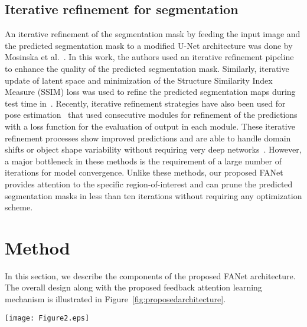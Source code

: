 \documentclass[journal]{IEEEtran}
\begin{document}
\subsection{Iterative refinement for segmentation}
An iterative refinement of the segmentation mask by feeding the input image and the predicted segmentation mask to a modified U-Net architecture was done by Mosinska et al.~\cite{mosinska2018beyond}. {In this work, the authors used an iterative refinement pipeline to enhance the quality of the predicted segmentation mask}. Similarly, iterative update of latent space and minimization of the Structure Similarity Index Measure (SSIM) loss was used to refine the predicted segmentation maps during test time in~\cite{Prashant:ECCV20}. Recently, iterative refinement strategies have also been used for pose estimation~\cite{newell2016stacked,wei2016convolutional} that used consecutive modules for refinement of the predictions with a loss function for the evaluation of output in each module. These iterative refinement processes show improved predictions and are able to handle domain shifts or object shape variability without requiring very deep networks~\cite{Prashant:ECCV20}. However, a major bottleneck in these methods is the requirement of a large number of iterations for model convergence. Unlike these methods, our proposed \ac{FANet} provides attention to the specific region-of-interest and can prune the {predicted segmentation masks} in less than ten iterations without requiring any optimization scheme. 

\section{Method}
\label{methodology}
{In this section, we describe the components of the proposed \ac{FANet} architecture.} The overall design along with the proposed feedback attention learning mechanism is illustrated in  Figure~\ref{fig:proposedarchitecture}. 

\begin{figure*}[t!]
    \centering
    \texttt{[image: Figure2.eps]}
    \caption{FANet with squeeze and excite residual (SE-Residual) block and MixPool block. (a) SE-Residual block integrated with squeeze and excite layer uses  convolution to concatenate the high-resolution feature representation with the the encoded feature vector. (b) MixPool block represents attention mechanism in our network. The input mask is downscaled to the corresponding layer feature map size  which is fused with the masked feature map representation  for hard attention of input feature in that layer . Finally, the attenuated feature map  and the feature maps  are both concatenated. c) Proposed FANet showing the complete network architecture. Encoder-decoder architecture with skip-connections (in dotted arrows) from SE-Residual blocks to preserve high- and intermediate resolution feature representations and MixPool block connections (with solid arrows) that allow to feedback the previous mask predictions.} \label{fig:proposedarchitecture}
\end{figure*}
\end{document}
